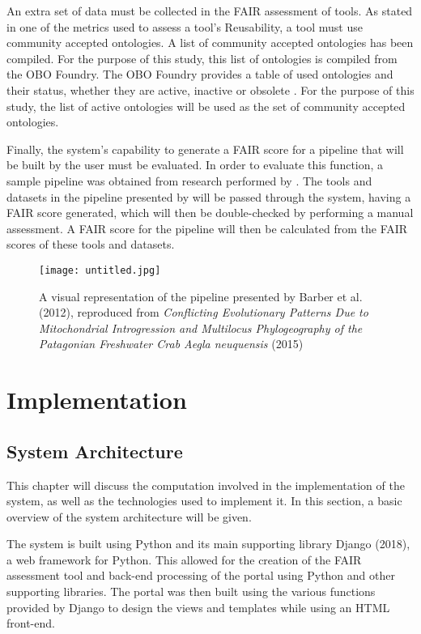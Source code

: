 \documentclass{cisfyp}
\begin{document}
An extra set of data must be collected in the FAIR assessment of tools. As stated in one of the metrics used to assess a tool's Reusability, a tool must use community accepted ontologies. A list of community accepted ontologies has been compiled. For the purpose of this study, this list of ontologies is compiled from the OBO Foundry. The OBO Foundry provides a table 
of used ontologies and their status, whether they are active, inactive or obsolete \cite{obo}. For the purpose of this study, the list of active ontologies will be used as the set of community accepted ontologies.

Finally, the system's capability to generate a FAIR score for a pipeline that will be built by the user must be evaluated. In order to evaluate this function, a sample pipeline was obtained from research performed by \cite{Barber2012}. The tools and datasets in the pipeline presented by \cite{Barber2012} will be passed through the system, having a FAIR score generated, which will then be double-checked by performing a manual assessment. A FAIR score for the pipeline will then be calculated from the FAIR scores of these tools and datasets. \newline\newline

\begin{figure}[h]
	\centering
	\texttt{[image: untitled.jpg]}
	\caption{A visual representation of the pipeline presented by Barber et al. (2012), reproduced from \textit{Conflicting Evolutionary Patterns Due to Mitochondrial Introgression and Multilocus Phylogeography of the Patagonian Freshwater Crab Aegla neuquensis} (2015)}
	\label{fig:pipeline}
\end{figure}\pagebreak
\chapter{Implementation}
\section{System Architecture}
This chapter will discuss the computation involved in the implementation of the system, as well as the technologies used to implement it. In this section, a basic overview of the system architecture will be given.

The system is built using Python and its main supporting library Django (2018), a web framework for Python. This allowed for the creation of the FAIR assessment tool and back-end processing of the portal using Python and other supporting libraries. The portal was then built using the various functions provided by Django to design the views and templates while using an HTML front-end.
\end{document}
